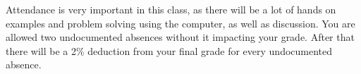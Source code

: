 Attendance is very important in this class, as there will be a lot of hands on examples and problem solving using the computer, as well as discussion. You are allowed two undocumented absences without it impacting your grade. After that there will be a 2\% deduction from your final grade for every undocumented absence. 
